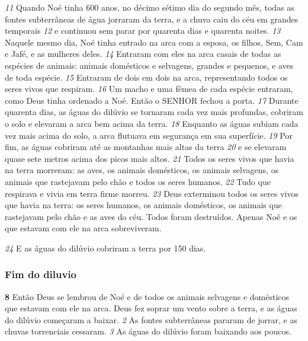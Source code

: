 \bigskip
\textit{\tiny 11}
 Quando Noé tinha 600 anos, no décimo sétimo dia do segundo mês, todas as fontes subterrâneas de água jorraram da terra, e a chuva caiu do céu em grandes temporais 
\textit{\tiny 12}
 e continuou sem parar por quarenta dias e quarenta noites. 
\textit{\tiny 13}
 Naquele mesmo dia, Noé tinha entrado na arca com a esposa, os filhos, Sem, Cam e Jafé, e as mulheres deles. 
\textit{\tiny 14}
 Entraram com eles na arca casais de todas as espécies de animais: animais domésticos e selvagens, grandes e pequenos, e aves de toda espécie. 
\textit{\tiny 15}
 Entraram de dois em dois na arca, representando todos os seres vivos que respiram. 
\textit{\tiny 16}
 Um macho e uma fêmea de cada espécie entraram, como Deus tinha ordenado a Noé. Então o SENHOR fechou a porta. 
\textit{\tiny 17}
 Durante quarenta dias, as águas do dilúvio se tornaram cada vez mais profundas, cobriram o solo e elevaram a arca bem acima da terra. 
\textit{\tiny 18}
 Enquanto as águas subiam cada vez mais acima do solo, a arca flutuava em segurança em sua superfície. 
\textit{\tiny 19}
 Por fim, as águas cobriram até as montanhas mais altas da terra 
\textit{\tiny 20}
 e se elevaram quase sete metros acima dos picos mais altos. 
\textit{\tiny 21}
 Todos os seres vivos que havia na terra morreram: as aves, os animais domésticos, os animais selvagens, os animais que rastejavam pelo chão e todos os seres humanos. 
\textit{\tiny 22}
 Tudo que respirava e vivia em terra firme morreu. 
\textit{\tiny 23}
 Deus exterminou todos os seres vivos que havia na terra: os seres humanos, os animais domésticos, os animais que rastejavam pelo chão e as aves do céu. Todos foram destruídos. Apenas Noé e os que estavam com ele na arca sobreviveram.



\bigskip
\textit{\tiny 24}
 E as águas do dilúvio cobriram a terra por 150 dias.



\bigskip
\subsubsection*{Fim do diluvio}


\textbf{\large 8}
 Então Deus se lembrou de Noé e de todos os animais selvagens e domésticos que estavam com ele na arca. Deus fez soprar um vento sobre a terra, e as águas do dilúvio começaram a baixar. 
\textit{\tiny 2}
 As fontes subterrâneas pararam de jorrar, e as chuvas torrenciais cessaram. 
\textit{\tiny 3}
 As águas do dilúvio foram baixando aos poucos.


